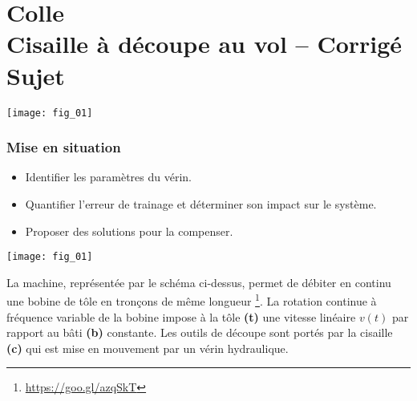 \chapter*{Colle  \\ 
Cisaille à découpe au vol -- \ifprof Corrigé \else Sujet \fi}


\iflivret {} \else
\ifprof  {} \else \fi
\fi
\setcounter{question}{0}

\begin{marginfigure}
\centering
\texttt{[image: fig\_01]}
\end{marginfigure}





\subsection*{Mise en situation}
\ifprof
\else
\begin{obj}
\begin{itemize}
\item Identifier les paramètres du vérin.
\item Quantifier l'erreur de trainage et déterminer son impact sur le système.
\item Proposer des solutions pour la compenser.
\end{itemize}
\end{obj}
\begin{center}
\texttt{[image: fig\_01]}
\end{center}

La machine, représentée par le schéma ci-dessus, permet de débiter en continu une bobine de tôle en tronçons de même longueur \footnote{
\url{https://goo.gl/azqSkT}}. La rotation continue à fréquence variable de la bobine impose à la tôle \textbf{(t)} une vitesse linéaire $v(t)$ par rapport au bâti \textbf{(b)} constante.
Les outils de découpe sont portés par la cisaille \textbf{(c)} qui est mise en mouvement par un vérin hydraulique.

